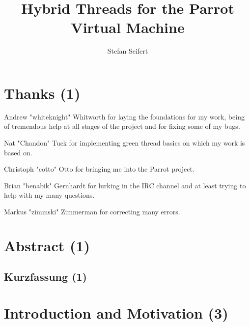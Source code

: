 \documentclass[bachelor,english]{hgbthesis}
\begin{document}
\title{Hybrid Threads for the Parrot Virtual Machine}

\author{Stefan Seifert}


\frontmatter
\maketitle
\tableofcontents

\chapter{Thanks (1)}

Andrew "whiteknight" Whitworth for laying the foundations for my work, being of tremendous help at all stages of the project and for fixing some of my bugs.

Nat "Chandon" Tuck for implementing green thread basics on which my work is based on.

Christoph "cotto" Otto for bringing me into the Parrot project.

Brian "benabik" Gernhardt for lurking in the IRC channel and at least trying to help with my many questions.

Markus "zimmski" Zimmerman for correcting many errors.

\chapter{Abstract (1)}

\begin{german}
\chapter{Kurzfassung (1)}
\end{german}

\mainmatter

\chapter{Introduction and Motivation (3)}
\end{document}
